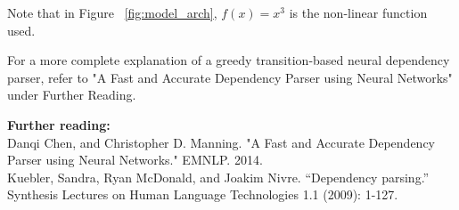 \documentclass{tufte-handout}
\begin{document}
Note that in Figure ~\ref{fig:model_arch}, $f(x)=x^3$ is the non-linear function used.

\par%
\bigskip
For a more complete explanation of a greedy transition-based neural dependency parser, refer to "A Fast and Accurate Dependency Parser using Neural Networks" under Further Reading.

\par%
\bigskip

\textbf{Further reading:} \\

Danqi Chen, and Christopher D. Manning. "A Fast and Accurate Dependency Parser using Neural Networks." EMNLP. 2014. \\

Kuebler, Sandra, Ryan McDonald, and Joakim Nivre. ``Dependency parsing.'' Synthesis Lectures on Human Language Technologies 1.1 (2009): 1-127.
\end{document}
